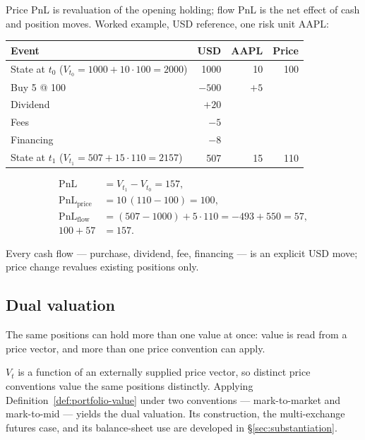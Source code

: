 \documentclass[11pt,a4paper]{article}
\begin{document}
\noindent Price PnL is revaluation of the opening holding; flow PnL is the net effect of cash and position moves. Worked example, USD reference, one risk unit AAPL:

\begin{center}
\begin{tabular}{l r r r}
\toprule
\textbf{Event} & \textbf{USD} & \textbf{AAPL} & \textbf{Price} \\
\midrule
State at $t_0$ \quad ($V_{t_0}=1000+10\cdot100=2000$) & 1000 & 10 & 100 \\
\midrule
Buy 5 @ 100 & $-500$ & $+5$ & \\
Dividend & $+20$ & & \\
Fees & $-5$ & & \\
Financing & $-8$ & & \\
\midrule
State at $t_1$ \quad ($V_{t_1}=507+15\cdot110=2157$) & 507 & 15 & 110 \\
\bottomrule
\end{tabular}
\end{center}

\begin{align*}
\mathrm{PnL} &= V_{t_1} - V_{t_0} = 157, \\
\mathrm{PnL}_{\text{price}} &= 10\,(110-100) = 100, \\
\mathrm{PnL}_{\text{flow}} &= (507-1000) + 5\cdot110 = -493 + 550 = 57, \\
100 + 57 &= 157.
\end{align*}

\noindent Every cash flow --- purchase, dividend, fee, financing --- is an explicit USD move; price change revalues existing positions only.

\subsection{Dual valuation}

\noindent The same positions can hold more than one value at once: value is read from a price vector, and more than one price convention can apply.

\medskip
$V_t$ is a function of an externally supplied price vector, so distinct price conventions value the same positions distinctly. Applying Definition~\ref{def:portfolio-value} under two conventions --- mark-to-market and mark-to-mid --- yields the dual valuation. Its construction, the multi-exchange futures case, and its balance-sheet use are developed in \S\ref{sec:substantiation}.
\end{document}
